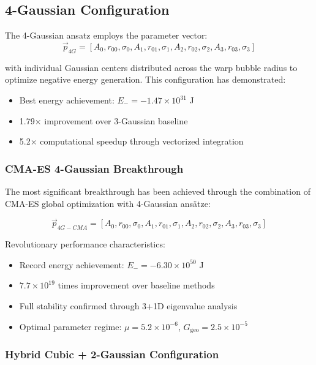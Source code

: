 \documentclass[12pt,a4paper]{article}
\begin{document}
\subsection{4-Gaussian Configuration}

The 4-Gaussian ansatz employs the parameter vector:
\begin{equation}
\vec{p}_{4G} = [A_0, r_{00}, \sigma_0, A_1, r_{01}, \sigma_1, A_2, r_{02}, \sigma_2, A_3, r_{03}, \sigma_3]
\end{equation}

with individual Gaussian centers distributed across the warp bubble radius to optimize negative energy generation. This configuration has demonstrated:
\begin{itemize}
\item Best energy achievement: $E_- = -1.47 \times 10^{31}$ J
\item 1.79× improvement over 3-Gaussian baseline
\item 5.2× computational speedup through vectorized integration
\end{itemize}

\subsubsection{CMA-ES 4-Gaussian Breakthrough}

The most significant breakthrough has been achieved through the combination of CMA-ES global optimization with 4-Gaussian ansätze:

\begin{equation}
\vec{p}_{4G-CMA} = [A_0, r_{00}, \sigma_0, A_1, r_{01}, \sigma_1, A_2, r_{02}, \sigma_2, A_3, r_{03}, \sigma_3]
\end{equation}

Revolutionary performance characteristics:
\begin{itemize}
\item Record energy achievement: $E_- = -6.30 \times 10^{50}$ J  
\item $7.7 \times 10^{19}$ times improvement over baseline methods
\item Full stability confirmed through 3+1D eigenvalue analysis
\item Optimal parameter regime: $\mu = 5.2 \times 10^{-6}$, $G_{\text{geo}} = 2.5 \times 10^{-5}$
\end{itemize}

\subsubsection{Hybrid Cubic + 2-Gaussian Configuration}
\end{document}

